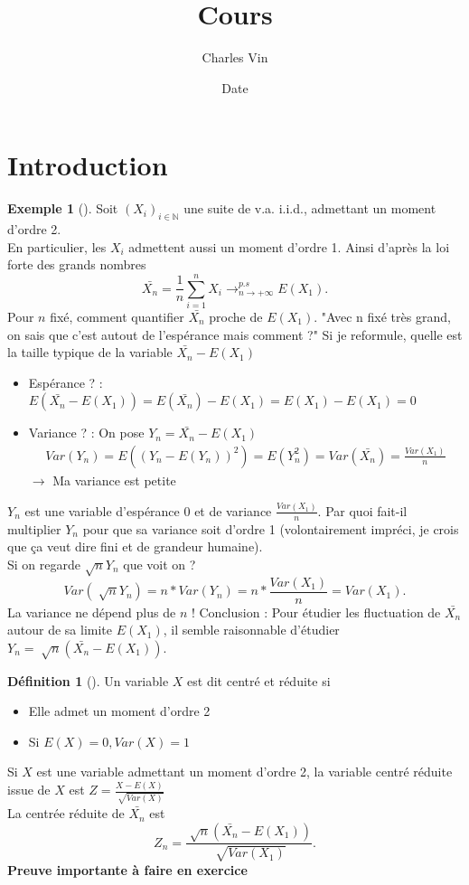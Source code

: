 \documentclass{article}
\title{Cours}
\author{Charles Vin}
\date{Date}
\theoremstyle{plain}%
\theoremstyle{definition}
\newtheorem{defn}{Définition}[section]
\newtheorem{exmp}{Exemple}[section]
\theoremstyle{remark}
\begin{document}
\maketitle

\section{Introduction}
\begin{exmp}[]
    Soit $ (X_i)_{i \in \mathbb{N}} $ une suite de v.a. i.i.d., admettant un moment d'ordre 2. \\
    En particulier, les $ X_i $ admettent aussi un moment d'ordre 1. Ainsi d'après la loi forte des grands nombres 
    \[
        \bar{X_n} = \frac{1}{n}\sum_{i=1}^{n}X_i \to^{p.s}_{n \to +\infty}E(X_1)
    .\]
    Pour $ n $ fixé, comment quantifier $ \bar{X_n} $ proche de $ E(X_1) $. "Avec n fixé très grand, on sais que c'est autout de l'espérance mais comment ?"
    Si je reformule, quelle est la taille typique de la variable $ \bar{X_n} - E(X_1) $ \begin{itemize}
        \item Espérance ? : $ E(\bar{X_n}-E(X_1)) = E(\bar{X_n}) - E(X_1) = E(X_1) - E(X_1) = 0 $ 
        \item Variance ? : On pose $ Y_n = \bar{X_n} - E(X_1) $ \begin{align*}
            Var(Y_n) = E((Y_n - E(Y_n))^2) = E(Y_n^2) = Var(\bar{X_n}) = \frac{Var(X_1)}{n}
        \end{align*} 
        $\rightarrow$ Ma variance est petite
    \end{itemize}
    $ Y_n $ est une variable d'espérance 0 et de variance $ \frac{Var(X_1)}{n} $. Par quoi fait-il multiplier $ Y_n $ pour que sa variance soit d'ordre 1 (volontairement impréci, je crois que ça veut dire fini et de grandeur humaine). \\
    Si on regarde $ \sqrt{n} Y_n $ que voit on ? 
    \[
        Var(\sqrt[]{n}Y_n) = n* Var(Y_n) = n * \frac{Var(X_1)}{n} = Var(X_1)
    .\]
    La variance ne dépend plus de $ n $ ! Conclusion : Pour étudier les fluctuation de $ \bar{X_n} $ autour de sa limite $ E(X_1) $, il semble raisonnable d'étudier $ Y_n = \sqrt[]{n}(\bar{X_n} - E(X_1)) $.
\end{exmp}
\begin{defn}[]
    Un variable $ X $ est dit centré et réduite si \begin{itemize}
        \item Elle admet un moment d'ordre 2 
        \item Si $ E(X) = 0, Var(X) = 1 $ 
    \end{itemize}
    Si $ X $ est une variable admettant un moment d'ordre 2, la variable centré réduite issue de $ X $ est $ Z = \frac{X-E(X)}{\sqrt[]{Var(X)}}$ \\
    La centrée réduite de $ \bar{X_n} $ est 
    \[
        Z_n = \frac{\sqrt[]{n} (\bar{X_n}-E(X_1))}{\sqrt[]{Var(X_1)}}
    .\]
    \textbf{Preuve importante à faire en exercice}
\end{defn}
\end{document}
